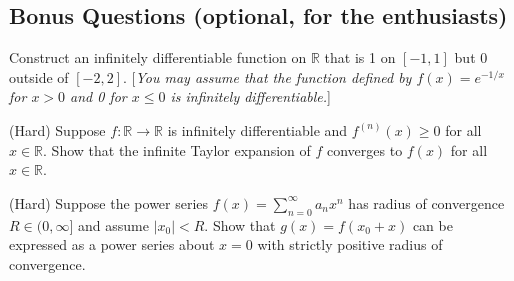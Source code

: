 \documentclass[answers]{exam}
\begin{document}
\begin{questions}



\section*{Bonus Questions (optional, for the enthusiasts)}

\question%
Construct an infinitely differentiable function on $\mathbb{R}$ that is 1 on $[-1,1]$ but 0 outside of $[-2,2]$. [\emph{You may assume that the function defined by $f(x)=e^{-1 / x}$ for $x>0$ and 0 for $x \leq 0$ is infinitely differentiable.}]%



\question%
(Hard) Suppose $f: \mathbb{R} \to \mathbb{R}$ is infinitely differentiable and $f^{(n)}(x) \geq 0$ for all $x \in \mathbb{R}$. Show that the infinite Taylor expansion of $f$ converges to $f(x)$ for all $x \in \mathbb{R}$.



\question%
(Hard) Suppose the power series $f(x)=\sum_{n=0}^{\infty} a_{n} x^{n}$ has radius of convergence $R \in(0, \infty]$ and assume $\left|x_{0}\right|<R$. Show that $g(x)=f\left(x_{0}+x\right)$ can be expressed as a power series about $x=0$ with strictly positive radius of convergence.

\end{questions}
\end{document}
